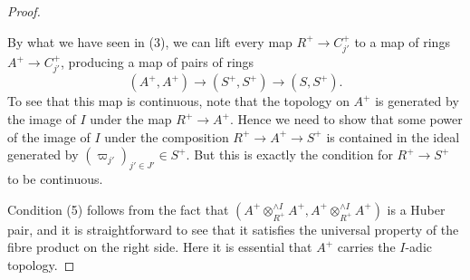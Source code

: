 \documentclass[10pt,twoside]{article}
\numberwithin{equation}{section}
\theoremstyle{plain}
\theoremstyle{definition}
\begin{document}
\begin{proof}
\begin{center}
\end{center}
By what we have seen in (3), we can lift every map \(R^+\to C^+_{j'}\) to a map of rings \(A^+\to C^+_{j'}\), producing a map of pairs of rings 
\[(A^+,A^+)\longrightarrow (S^+,S^+)\longrightarrow(S,S^+).\]
To see that this map is continuous, note that the topology on \(A^+\) is generated by the image of \(I\) under the map \(R^+\to A^+\). Hence we need to show that some power of the image of \(I\) under the composition \(R^+\to A^+\to S^+\) is contained in the ideal generated by \((\varpi_{j'})_{{j'}\in J'}\in S^+\). But this is exactly the condition for \(R^+\to S^+\) to be continuous.\par
Condition (5) follows from the fact that \((A^+\otimes^{\wedge I}_{R^+} A^+,A^+\otimes^{\wedge I}_{R^+} A^+)\) is a Huber pair, and it is straightforward to see that it satisfies the universal property of the fibre product on the right side. Here it is essential that \(A^+\) carries the \(I\)-adic topology.
\end{proof}
\end{document}
